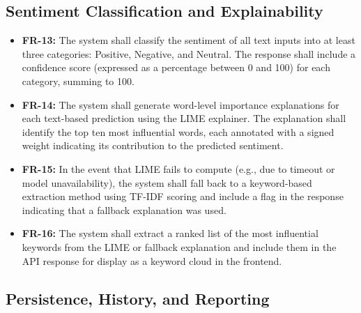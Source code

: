 \documentclass[12pt, a4paper]{report}
\begin{document}
\subsection{Sentiment Classification and Explainability}

\begin{itemize}[noitemsep, leftmargin=2em]
    \item \textbf{FR-13:} The system shall classify the sentiment of all text inputs into at least three categories: Positive, Negative, and Neutral. The response shall include a confidence score (expressed as a percentage between 0 and 100) for each category, summing to 100.
    \item \textbf{FR-14:} The system shall generate word-level importance explanations for each text-based prediction using the LIME explainer. The explanation shall identify the top ten most influential words, each annotated with a signed weight indicating its contribution to the predicted sentiment.
    \item \textbf{FR-15:} In the event that LIME fails to compute (e.g., due to timeout or model unavailability), the system shall fall back to a keyword-based extraction method using TF-IDF scoring and include a flag in the response indicating that a fallback explanation was used.
    \item \textbf{FR-16:} The system shall extract a ranked list of the most influential keywords from the LIME or fallback explanation and include them in the API response for display as a keyword cloud in the frontend.
\end{itemize}

\subsection{Persistence, History, and Reporting}
\end{document}
